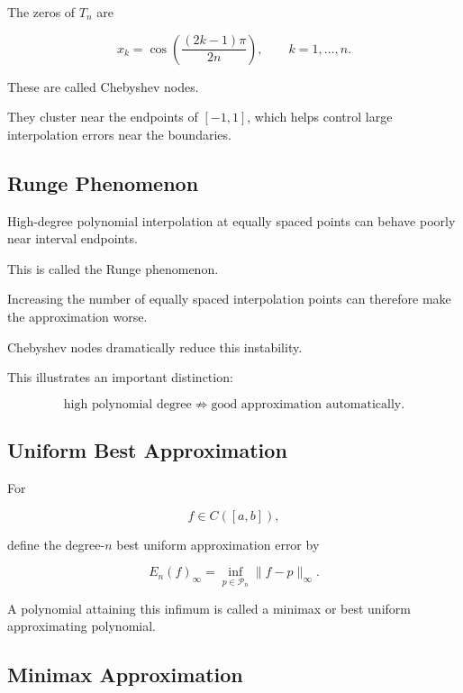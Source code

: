 The zeros of \(T_n\) are

\[
\boxed{
x_k
=
\cos
\left(
\frac{(2k-1)\pi}{2n}
\right),
\qquad
k=1,\ldots,n.
}
\]

These are called Chebyshev nodes.

They cluster near the endpoints of \([-1,1]\), which helps control large
interpolation errors near the boundaries.

\subsection{Runge Phenomenon}
\label{subsec:runge-phenomenon}

High-degree polynomial interpolation at equally spaced points can behave
poorly near interval endpoints.

This is called the Runge phenomenon.

Increasing the number of equally spaced interpolation points can
therefore make the approximation worse.

Chebyshev nodes dramatically reduce this instability.

This illustrates an important distinction:

\[
\boxed{
\text{high polynomial degree}
\not\Rightarrow
\text{good approximation automatically}.
}
\]

\subsection{Uniform Best Approximation}
\label{subsec:uniform-best-approximation}

For

\[
f\in C([a,b]),
\]

define the degree-\(n\) best uniform approximation error by

\[
\boxed{
E_n(f)_\infty
=
\inf_{p\in\mathcal{P}_n}
\|f-p\|_\infty.
}
\]

A polynomial attaining this infimum is called a minimax or best uniform
approximating polynomial.

\subsection{Minimax Approximation}
\label{subsec:minimax-approximation}

